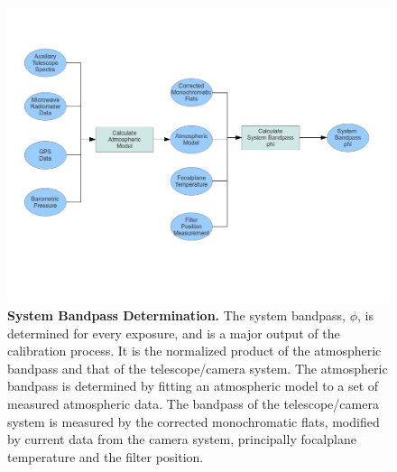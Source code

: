 \documentclass[12pt,preprint]{aastex}
\begin{document}
\begin{figure}[htbp]
\includegraphics[width=6.5in]{CalibDataProdSchematic3}
\caption{ {\small {\bf System Bandpass Determination.} The system bandpass, $\phi$, is determined for every exposure, and is a major output of the calibration process.  It is the normalized product of the atmospheric bandpass and that of the telescope/camera system.  The atmospheric bandpass is determined by fitting an atmospheric model to a set of measured atmospheric data.  The bandpass of the telescope/camera system is measured by the corrected monochromatic flats, modified by current data from the camera system, principally focalplane temperature and the filter position. }
\label{fig:overview_flowchart3} }
\end{figure}
\end{document}

